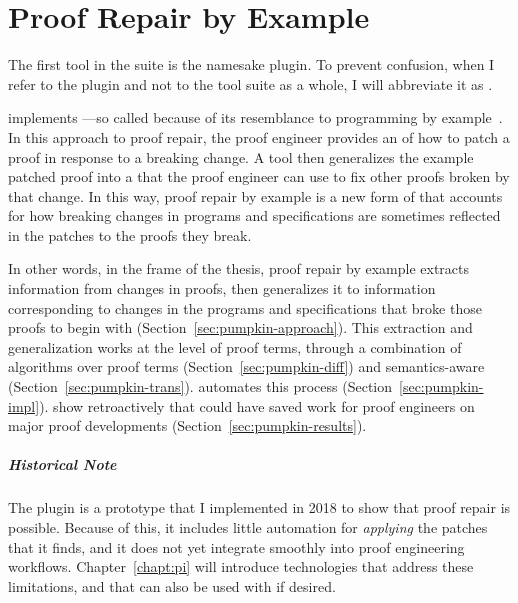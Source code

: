 \chapter{Proof Repair by Example}
\label{ch:example}

The first tool in the    suite is the namesake \sysnamelong plugin.
To prevent confusion, when I refer to the \sysnamelong plugin and not to the tool suite as a whole, I will abbreviate it as \intro{\sysname}.

\sysname implements ---so called because of its resemblance to programming by example~\cite{DBLP:journals/ftpl/GulwaniPS17}.
In this approach to proof repair, the proof engineer provides an  of how to patch a proof in response to a breaking change.
A tool then generalizes the example patched proof into a  that the proof engineer can use to fix other proofs broken by that change.
In this way, proof repair by example is a new form of  that accounts for how 
breaking changes in programs and specifications are sometimes reflected in the patches to the proofs they break.

In other words, in the frame of the thesis, proof repair by example extracts information from changes in proofs,
then generalizes it to information corresponding to changes in the programs and specifications that broke those proofs to begin with (Section~\ref{sec:pumpkin-approach}).
This extraction and generalization works at the level of proof terms, through a combination of  algorithms 
over proof terms (Section~\ref{sec:pumpkin-diff}) and 
semantics-aware  (Section~\ref{sec:pumpkin-trans}).
 automates this process (Section~\ref{sec:pumpkin-impl}).
 show retroactively that \sysname could have saved work for proof engineers
on major proof developments (Section~\ref{sec:pumpkin-results}).

\paragraph{Historical Note}
The \sysname plugin is a prototype that I implemented in 2018 to show that proof repair is possible.
Because of this, it includes little automation for \textit{applying} the patches that it finds,
and it does not yet integrate smoothly into proof engineering workflows.
Chapter~\ref{chapt:pi} will introduce technologies that address these limitations,
and that can also be used with \sysname if desired.

